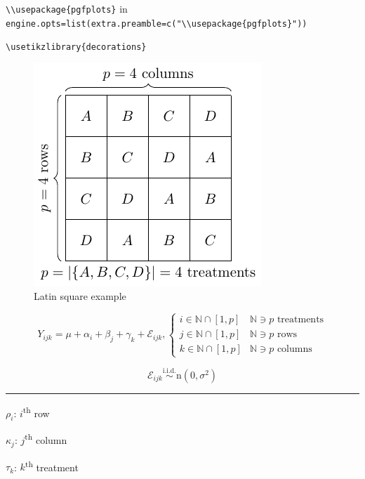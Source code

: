 \documentclass[
]{book}
\theoremstyle{definition}
\theoremstyle{definition}
\theoremstyle{definition}
\theoremstyle{definition}
\theoremstyle{remark}
\begin{document}
\texttt{\textbackslash{}\textbackslash{}usepackage\{pgfplots\}} in \texttt{engine.opts=list(extra.preamble=c("\textbackslash{}\textbackslash{}usepackage\{pgfplots\}"))}

\texttt{\textbackslash{}usetikzlibrary\{decorations\}}

\begin{figure}
\centering
\includegraphics{202403232342-experimental-design_files/figure-latex/unnamed-chunk-2-1.pdf}
\caption{\label{fig:unnamed-chunk-2}Latin square example}
\end{figure}

\[
Y_{{\scriptscriptstyle ijk}}=\mu+\alpha_{{\scriptscriptstyle i}}+\beta_{{\scriptscriptstyle j}}+\gamma_{{\scriptscriptstyle k}}+\mathcal{E}_{{\scriptscriptstyle ijk}},\begin{cases}
i\in\mathbb{N}\cap\left[1,p\right] & \mathbb{N}\ni p\text{ treatments}\\
j\in\mathbb{N}\cap\left[1,p\right] & \mathbb{N}\ni p\text{ rows}\\
k\in\mathbb{N}\cap\left[1,p\right] & \mathbb{N}\ni p\text{ columns}
\end{cases}
\]

\[
\mathcal{E}_{{\scriptscriptstyle ijk}}\overset{\text{i.i.d.}}{\sim}\mathrm{n}\left(0,\sigma^{2}\right)
\]

\begin{center}\rule{0.5\linewidth}{0.5pt}\end{center}

\(\rho_{{\scriptscriptstyle i}}\): \(i\)\textsuperscript{th} row

\(\kappa_{{\scriptscriptstyle j}}\): \(j\)\textsuperscript{th} column

\(\tau_{{\scriptscriptstyle k}}\): \(k\)\textsuperscript{th} treatment
\end{document}
